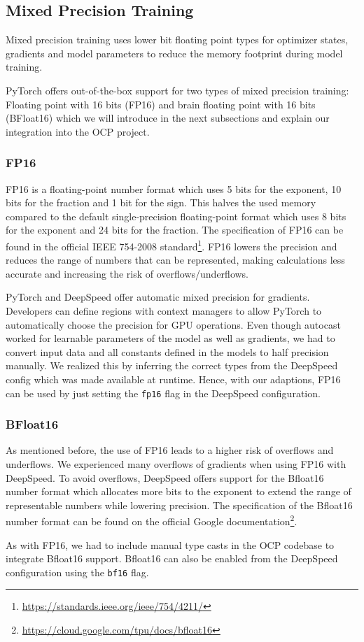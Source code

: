 \subsection{Mixed Precision Training}
\label{subsection:mixedprecision}

Mixed precision training uses lower bit floating point types for optimizer states, gradients and model parameters to 
reduce the memory footprint during model training. 

PyTorch offers out-of-the-box support for two types of mixed precision training: Floating point with 16 bits (FP16) and 
brain floating point with 16 bits (BFloat16) which we will introduce in the next subsections and explain our integration 
into the OCP project.

\subsubsection{FP16}

FP16 is a floating-point number format which uses 5 bits for the exponent, 10 bits for the fraction and 1 bit for the 
sign. This halves the used memory compared to the default single-precision floating-point format which uses 8 bits 
for the exponent and 24 bits for the fraction. The specification of FP16 can be found in the official IEEE 754-2008 
standard\footnote{\url{https://standards.ieee.org/ieee/754/4211/}}.
FP16 lowers the precision and reduces the range of numbers that can be represented, making calculations less 
accurate and increasing the risk of overflows/underflows.

PyTorch and DeepSpeed offer automatic mixed precision for gradients. Developers can define regions with context managers 
to allow PyTorch to automatically choose the precision for GPU operations. Even though autocast worked for learnable
parameters of the model as well as gradients, we had to convert input data and all constants defined in the models to half
precision manually. We realized this by inferring the correct types from the DeepSpeed config which was made available 
at runtime. Hence, with our adaptions, 
FP16 can be used by just setting the \texttt{fp16} flag in the DeepSpeed configuration.

\subsubsection{BFloat16}

As mentioned before, the use of FP16 leads to a higher risk of overflows and underflows. We experienced many overflows 
of gradients when using FP16 with DeepSpeed. To avoid overflows, DeepSpeed offers support for the Bfloat16 number 
format which allocates more bits to the exponent to extend the range of representable numbers while lowering 
precision. The specification of the Bfloat16 number format can be found on the official Google documentation\footnote{\url{https://cloud.google.com/tpu/docs/bfloat16}}. 

As with FP16, we had to include manual type casts in the OCP codebase to integrate Bfloat16 support. 
Bfloat16 can also be enabled from the DeepSpeed configuration using the \texttt{bf16} flag.



